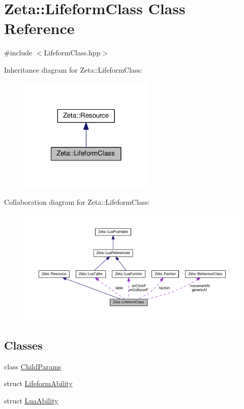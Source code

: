 \hypertarget{classZeta_1_1LifeformClass}{\section{Zeta\+:\+:Lifeform\+Class Class Reference}
\label{classZeta_1_1LifeformClass}
}


{\ttfamily \#include $<$Lifeform\+Class.\+hpp$>$}



Inheritance diagram for Zeta\+:\+:Lifeform\+Class\+:\nopagebreak
\begin{figure}[H]
\begin{center}
\leavevmode
\includegraphics[width=182pt]{classZeta_1_1LifeformClass__inherit__graph}
\end{center}
\end{figure}


Collaboration diagram for Zeta\+:\+:Lifeform\+Class\+:\nopagebreak
\begin{figure}[H]
\begin{center}
\leavevmode
\includegraphics[width=350pt]{classZeta_1_1LifeformClass__coll__graph}
\end{center}
\end{figure}
\subsection*{Classes}
\begin{DoxyCompactItemize}
\item 
class \hyperlink{classZeta_1_1LifeformClass_1_1ChildParams}{Child\+Params}
\item 
struct \hyperlink{structZeta_1_1LifeformClass_1_1LifeformAbility}{Lifeform\+Ability}
\item 
struct \hyperlink{structZeta_1_1LifeformClass_1_1LuaAbility}{Lua\+Ability}
\end{DoxyCompactItemize}
